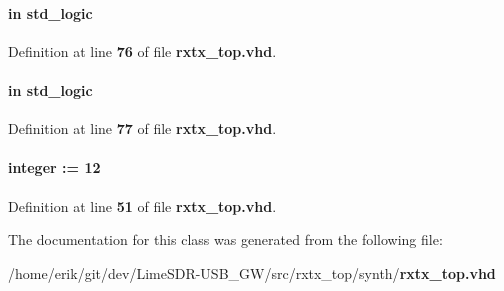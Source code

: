 \paragraph[{wfm\+\_\+pll\+\_\+ref\+\_\+clk}]{ {\bfseries \textcolor{keywordflow}{in}\textcolor{vhdlchar}{ }} {\bfseries \textcolor{comment}{std\+\_\+logic}\textcolor{vhdlchar}{ }} \hspace{0.3cm}{\ttfamily [Port]}}\label{classrxtx__top_afc195aaf73e504e6afb058a0ff545d37}


Definition at line {\bf 76} of file {\bf rxtx\+\_\+top.\+vhd}.

\paragraph[{wfm\+\_\+pll\+\_\+ref\+\_\+clk\+\_\+reset\+\_\+n}]{ {\bfseries \textcolor{keywordflow}{in}\textcolor{vhdlchar}{ }} {\bfseries \textcolor{comment}{std\+\_\+logic}\textcolor{vhdlchar}{ }} \hspace{0.3cm}{\ttfamily [Port]}}\label{classrxtx__top_a55b75bc5c3a516c8b0fb29216c411b40}


Definition at line {\bf 77} of file {\bf rxtx\+\_\+top.\+vhd}.

\paragraph[{W\+F\+M\+\_\+\+W\+F\+M\+\_\+\+I\+N\+F\+I\+F\+O\+\_\+\+S\+I\+ZE}]{ {\bfseries \textcolor{vhdlchar}{ }} {\bfseries \textcolor{comment}{integer}\textcolor{vhdlchar}{ }\textcolor{vhdlchar}{ }\textcolor{vhdlchar}{\+:}\textcolor{vhdlchar}{=}\textcolor{vhdlchar}{ }\textcolor{vhdlchar}{ } \textcolor{vhdldigit}{12} \textcolor{vhdlchar}{ }} \hspace{0.3cm}{\ttfamily [Generic]}}\label{classrxtx__top_a58ab2a53bd92a4d03e8736cdac639b44}


Definition at line {\bf 51} of file {\bf rxtx\+\_\+top.\+vhd}.



The documentation for this class was generated from the following file\+:\begin{DoxyCompactItemize}
\item 
/home/erik/git/dev/\+Lime\+S\+D\+R-\/\+U\+S\+B\+\_\+\+G\+W/src/rxtx\+\_\+top/synth/{\bf rxtx\+\_\+top.\+vhd}\end{DoxyCompactItemize}
